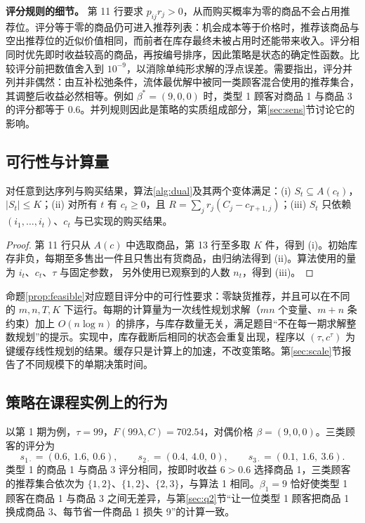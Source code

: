 \textbf{评分规则的细节。} 第 11 行要求 $p_{ij}r_j>0$，从而购买概率为零的商品不会占用推荐位。评分等于零的商品仍可进入推荐列表：机会成本等于价格时，推荐该商品与空出推荐位的近似价值相同，而前者在库存最终未被占用时还能带来收入。评分相同时优先即时收益较高的商品，再按编号排序，因此策略是状态的确定性函数。比较评分前把数值舍入到 $10^{-9}$，以消除单纯形求解的浮点误差。需要指出，评分并列并非偶然：由互补松弛条件，流体最优解中被同一类顾客混合使用的推荐集合，其调整后收益必然相等。例如 $\beta^{*}=(9,0,0)$ 时，类型 1 顾客对商品 1 与商品 3 的评分都等于 $0.6$。并列规则因此是策略的实质组成部分，第\ref{sec:sens}节讨论它的影响。

\subsection{可行性与计算量}
\begin{proposition}\label{prop:feasible}
对任意到达序列与购买结果，算法\ref{alg:dual}及其两个变体满足：(i) $S_t\subseteq A(c_t)$，$|S_t|\le K$；(ii) 对所有 $t$ 有 $c_t\ge0$，且 $R=\sum_jr_j(C_j-c_{T+1,j})$；(iii) $S_t$ 只依赖 $(i_1,\ldots,i_t)$、$c_t$ 与已实现的购买结果。
\end{proposition}
\begin{proof}
第 11 行只从 $A(c)$ 中选取商品，第 13 行至多取 $K$ 件，得到 (i)。初始库存非负，每期至多售出一件且只售出有货商品，由归纳法得到 (ii)。算法使用的量为 $i_t$、$c_t$、$\tau$ 与固定参数，\LPCount{} 另外使用已观察到的人数 $n_t$，得到 (iii)。
\end{proof}

命题\ref{prop:feasible}对应题目评分中的可行性要求：零缺货推荐，并且可以在不同的 $m,n,T,K$ 下运行。每期的计算量为一次线性规划求解（$mn$ 个变量、$m+n$ 条约束）加上 $O(n\log n)$ 的排序，与库存数量无关，满足题目“不在每一期求解整数规划”的提示。实现中，库存截断后相同的状态会重复出现，程序以 $(\tau,c^{\tau})$ 为键缓存线性规划的结果。缓存只是计算上的加速，不改变策略。第\ref{sec:scale}节报告了不同规模下的单期决策时间。

\subsection{策略在课程实例上的行为}\label{sec:behavior}
以第 1 期为例，$\tau=99$，$F(99\lambda,C)=702.54$，对偶价格 $\beta=(9,0,0)$。三类顾客的评分为
\begin{equation*}
s_{1\cdot}=(0.6,\ 1.6,\ 0.6),\qquad s_{2\cdot}=(0.4,\ 4.0,\ 0),\qquad s_{3\cdot}=(0.1,\ 1.6,\ 3.6).
\end{equation*}
类型 1 的商品 1 与商品 3 评分相同，按即时收益 $6>0.6$ 选择商品 1，三类顾客的推荐集合依次为 $\{1,2\}$、$\{1,2\}$、$\{2,3\}$，与算法 1 相同。$\beta_1=9$ 恰好使类型 1 顾客在商品 1 与商品 3 之间无差异，与第\ref{sec:q2}节“让一位类型 1 顾客把商品 1 换成商品 3、每节省一件商品 1 损失 9”的计算一致。

